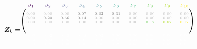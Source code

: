 \[
\design_k = \tiny\begin{blockarray}{cccccccccc}
\color[HTML]{440154}B_{1} & \color[HTML]{482878}B_{2} & \color[HTML]{3E4A89}B_{3} & \color[HTML]{31688E}B_{4} & \color[HTML]{26828E}B_{5} & \color[HTML]{1F9E89}B_{6} & \color[HTML]{35B779}B_{7} & \color[HTML]{6DCD59}B_{8} & \color[HTML]{B4DE2C}B_{9} & \color[HTML]{FDE725}B_{10} \\
\begin{block}{(cccccccccc)}
\phantom{x}\\
\color{lightgray}0.00 & \color{lightgray}0.00 & \color{lightgray}0.00 & \color{gray}0.07 & \color{gray}0.62 & \color{gray}0.31 & \color{lightgray}0.00 & \color{lightgray}0.00 & \color{lightgray}0.00 & \color{lightgray}0.00\color{black}\\
  \color{lightgray}0.00 & \color{gray}0.20 & \color{gray}0.66 & \color{gray}0.14 & \color{lightgray}0.00 & \color{lightgray}0.00 & \color{lightgray}0.00 & \color{lightgray}0.00 & \color{lightgray}0.00 & \color{lightgray}0.00\color{black}\\
  \color{lightgray}0.00 & \color{lightgray}0.00 & \color{lightgray}0.00 & \color{lightgray}0.00 & \color{lightgray}0.00 & \color{lightgray}0.00 & \color{lightgray}0.00 & \color[HTML]{6DCD59}0.17 & \color[HTML]{B4DE2C}0.67 & \color[HTML]{FDE725}0.17\color{black}\\
  \color{white}\vdots & \color{white}\vdots & \color{white}\vdots & \color{white}\vdots & \color{white}\vdots & \color{white}\vdots & \color{white}\vdots & \color{white}\vdots & \color{white}\vdots & \color{white}\vdots\\
\end{block}
\color{white}0.00 & \color{white}0.02 & \color{white}0.48 & \color{white}0.48 & \color{white}0.02 & \color{white}0.00 & \color{white}0.00 & \color{white}0.00 & \color{white}0.00 & \color{white}0.00\color{black}\\
  \color{white}0.00 & \color{white}0.00 & \color{white}0.00 & \color{white}0.01 & \color{white}0.40 & \color{white}0.55 & \color{white}0.04 & \color{white}0.00 & \color{white}0.00 & \color{white}0.00\color{black}\\
  \color{white}0.00 & \color{white}0.00 & \color{white}0.00 & \color{white}0.00 & \color{white}0.00 & \color{white}0.29 & \color{white}0.63 & \color{white}0.08 & \color{white}0.00 & \color{white}0.00\color{black}\\
\phantom{x}
\end{blockarray}
\]
\normalsize
